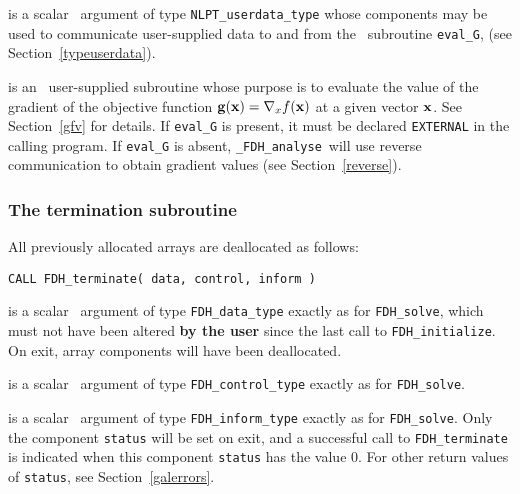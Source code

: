 \documentclass{galahad}
\newcommand{\packagename}{FDH}
\newcommand{\fullpackagename}{\libraryname\_\packagename}
\newcommand{\solver}{{\tt \fullpackagename\_analyse}}
\begin{document}
\begin{description}
 is a scalar \intentinout\ argument of type
{\tt NLPT\_userdata\_type} whose components may be used
to communicate user-supplied data to and from the
\optional\ subroutine {\tt eval\_G},
(see Section~\ref{typeuserdata}).

 is an \optional\
user-supplied subroutine whose purpose is to evaluate the value of the
gradient of the objective function ${\mathbf{g}}({\mathbf{x}}) = \nabla_x f({\mathbf{x}})$
at a given vector ${\mathbf{x}}$.
See Section~\ref{gfv} for details.
If {\tt eval\_G} is present,
it must be declared {\tt EXTERNAL} in the calling program.
If {\tt eval\_G} is absent, \solver\ will use reverse communication to
obtain gradient values (see Section~\ref{reverse}).

\end{description}


\subsubsection{The  termination subroutine}
All previously allocated arrays are deallocated as follows:
\vspace*{1mm}

\hspace{8mm}
{\tt CALL \packagename\_terminate( data, control, inform )}

\vspace*{-1mm}
\begin{description}

 is a scalar \intentinout\ argument of type
{\tt \packagename\_data\_type}
exactly as for
{\tt \packagename\_solve},
which must not have been altered {\bf by the user} since the last call to
{\tt \packagename\_initialize}.
On exit, array components will have been deallocated.

 is a scalar \intentin\ argument of type
{\tt \packagename\_control\_type}
exactly as for
{\tt \packagename\_solve}.

 is a scalar \intentout\ argument of type
{\tt \packagename\_inform\_type}
exactly as for
{\tt \packagename\_solve}.
Only the component {\tt status} will be set on exit, and a
successful call to
{\tt \packagename\_terminate}
is indicated when this  component {\tt status} has the value 0.
For other return values of {\tt status}, see Section~\ref{galerrors}.

\end{description}
\end{document}

